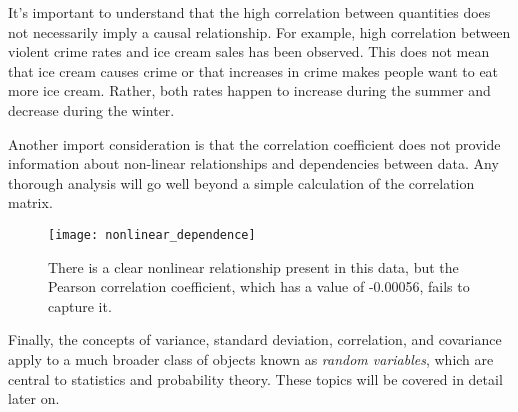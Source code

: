 It's important to understand that the high correlation between quantities does not necessarily imply
a causal relationship. For example, high correlation between violent crime rates and ice cream sales has
been observed. This does not mean that ice cream causes crime or that increases in crime makes people want
to eat more ice cream. Rather, both rates happen to increase during the summer and decrease during the winter.

Another import consideration is that the correlation coefficient does not provide information about
non-linear relationships and dependencies between data. Any thorough analysis will go well beyond a simple
calculation of the correlation matrix.

\begin{figure}[h]
\texttt{[image: nonlinear\_dependence]}
\caption{There is a clear nonlinear relationship present in this data, but the Pearson correlation
         coefficient, which has a value of -0.00056, fails to capture it.}
\label{fig:correlation}
\end{figure}

Finally, the concepts of variance, standard deviation, correlation, and covariance apply to a much broader class of objects
known as \emph{random variables}, which are central to statistics and probability theory. These topics will be
covered in detail later on.

